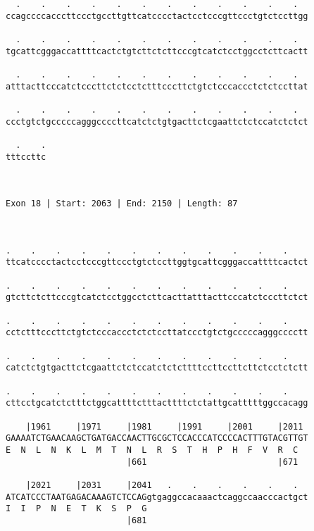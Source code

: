 \documentclass{article}
\begin{document}
\begin{Verbatim}
  .    .    .    .    .    .    .    .    .    .    .    .  
ccagccccacccttccctgccttgttcatcccctactcctcccgttccctgtctccttgg
                                                            
  .    .    .    .    .    .    .    .    .    .    .    .  
tgcattcgggaccattttcactctgtcttctcttcccgtcatctcctggcctcttcactt
                                                            
  .    .    .    .    .    .    .    .    .    .    .    .  
atttacttcccatctcccttctctcctctttcccttctgtctcccaccctctctccttat
                                                            
  .    .    .    .    .    .    .    .    .    .    .    .  
ccctgtctgcccccagggccccttcatctctgtgacttctcgaattctctccatctctct
                                                            
  .    .
tttccttc
        
        
 
Exon 18 | Start: 2063 | End: 2150 | Length: 87



.    .    .    .    .    .    .    .    .    .    .    .    
ttcatcccctactcctcccgttccctgtctccttggtgcattcgggaccattttcactct
                                                            
.    .    .    .    .    .    .    .    .    .    .    .    
gtcttctcttcccgtcatctcctggcctcttcacttatttacttcccatctcccttctct
                                                            
.    .    .    .    .    .    .    .    .    .    .    .    
cctctttcccttctgtctcccaccctctctccttatccctgtctgcccccagggcccctt
                                                            
.    .    .    .    .    .    .    .    .    .    .    .    
catctctgtgacttctcgaattctctccatctctcttttccttccttcttctcctctctt
                                                            
.    .    .    .    .    .    .    .    .    .    .    .    
cttcctgcatctctttctggcattttctttacttttctctattgcatttttggccacagg
                                                            
    |1961     |1971     |1981     |1991     |2001     |2011 
GAAAATCTGAACAAGCTGATGACCAACTTGCGCTCCACCCATCCCCACTTTGTACGTTGT
E  N  L  N  K  L  M  T  N  L  R  S  T  H  P  H  F  V  R  C  
                        |661                          |671  
  
    |2021     |2031     |2041   .    .    .    .    .    .  
ATCATCCCTAATGAGACAAAGTCTCCAGgtgaggccacaaactcaggccaacccactgct
I  I  P  N  E  T  K  S  P  G                                
                        |681                                
  

\end{Verbatim}
\end{document}
